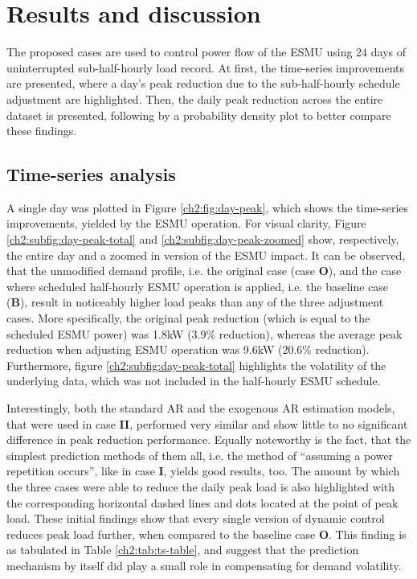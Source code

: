 \section{Results and discussion}
\label{ch2:sec:results}

The proposed cases are used to control power flow of the ESMU using 24 days of uninterrupted sub-half-hourly load record.
At first, the time-series improvements are presented, where a day's peak reduction due to the sub-half-hourly schedule adjustment are highlighted.
Then, the daily peak reduction across the entire dataset is presented, following by a probability density plot to better compare these findings.

\subsection{Time-series analysis}



A single day was plotted in Figure \ref{ch2:fig:day-peak}, which shows the time-series improvements, yielded by the ESMU operation.
For visual clarity, Figure \ref{ch2:subfig:day-peak-total} and \ref{ch2:subfig:day-peak-zoomed} show, respectively, the entire day and a zoomed in version of the ESMU impact.
It can be observed, that the unmodified demand profile, i.e. the original case (case \textbf{O}), and the case where scheduled half-hourly ESMU operation is applied, i.e. the  baseline case (\textbf{B}), result in noticeably higher load peaks than any of the three adjustment cases.
More specifically, the original peak reduction (which is equal to the scheduled ESMU power) was 1.8kW (3.9\% reduction), whereas the average peak reduction when adjusting ESMU operation was 9.6kW (20.6\% reduction).
Furthermore, figure \ref{ch2:subfig:day-peak-total} highlights the volatility of the underlying data, which was not included in the half-hourly ESMU schedule.

Interestingly, both the standard AR and the exogenous AR estimation models, that were used in case \textbf{II}, performed very similar and show little to no significant difference in peak reduction performance.
Equally noteworthy is the fact, that the simplest prediction methods of them all, i.e. the method of ``assuming a power repetition occurs'', like in case \textbf{I}, yields good results, too.
The amount by which the three cases were able to reduce the daily peak load is also highlighted with the corresponding horizontal dashed lines and dots located at the point of peak load.
These initial findings show that every single version of dynamic control reduces peak load further, when compared to the baseline case \textbf{O}.
This finding is as tabulated in Table \ref{ch2:tab:ts-table}, and suggest that the prediction mechanism by itself did play a small role in compensating for demand volatility.


